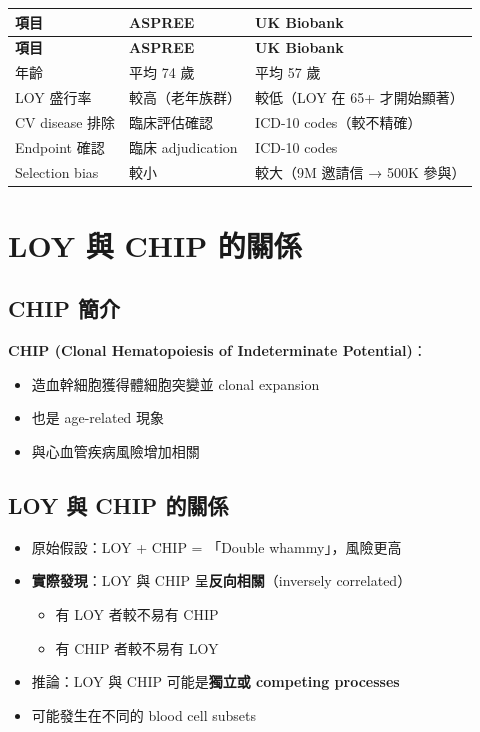 \documentclass[12pt,a4paper]{article}
\begin{document}
\begin{longtable}{p{4cm}p{5cm}p{5cm}}
\toprule
\textbf{項目} & \textbf{ASPREE} & \textbf{UK Biobank} \\
\midrule
\endfirsthead
\toprule
\textbf{項目} & \textbf{ASPREE} & \textbf{UK Biobank} \\
\midrule
\endhead
年齡 & 平均 74 歲 & 平均 57 歲 \\
\midrule
LOY 盛行率 & 較高（老年族群） & 較低（LOY 在 65+ 才開始顯著） \\
\midrule
CV disease 排除 & 臨床評估確認 & ICD-10 codes（較不精確） \\
\midrule
Endpoint 確認 & 臨床 adjudication & ICD-10 codes \\
\midrule
Selection bias & 較小 & 較大（9M 邀請信 → 500K 參與） \\
\bottomrule
\end{longtable}

\section{LOY 與 CHIP 的關係}

\subsection{CHIP 簡介}

\textbf{CHIP (Clonal Hematopoiesis of Indeterminate Potential)}：
\begin{itemize}
    \item 造血幹細胞獲得體細胞突變並 clonal expansion
    \item 也是 age-related 現象
    \item 與心血管疾病風險增加相關
\end{itemize}

\subsection{LOY 與 CHIP 的關係}

\begin{itemize}
    \item 原始假設：LOY + CHIP = 「Double whammy」，風險更高
    \item \textbf{實際發現}：LOY 與 CHIP 呈\textbf{反向相關}（inversely correlated）
    \begin{itemize}
        \item 有 LOY 者較不易有 CHIP
        \item 有 CHIP 者較不易有 LOY
    \end{itemize}
    \item 推論：LOY 與 CHIP 可能是\textbf{獨立或 competing processes}
    \item 可能發生在不同的 blood cell subsets
\end{itemize}
\end{document}
